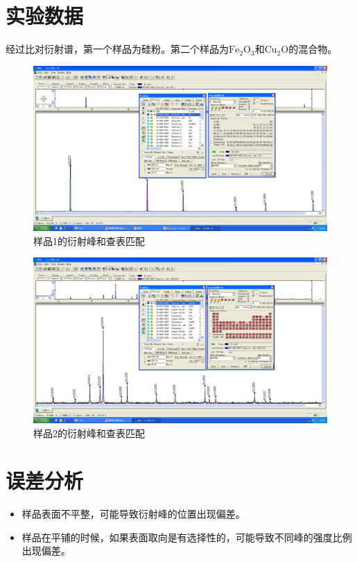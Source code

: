\documentclass[a4paper]{article}
\begin{document}
\section{实验数据}
经过比对衍射谱，第一个样品为硅粉。第二个样品为$\mathrm{Fe_{2}O_{3}}$和$\mathrm{Cu_{2}O}$的混合物。

\begin{figure}[H]
	\centering
	\includegraphics[width=1\linewidth]{data/图片2.png}
	\caption{样品1的衍射峰和查表匹配}
\end{figure}

\begin{figure}[H]
	\centering
	\includegraphics[width=1\linewidth]{data/图片1.png}
	\caption{样品2的衍射峰和查表匹配}
\end{figure}

\section{误差分析}
\begin{itemize}
	\item 样品表面不平整，可能导致衍射峰的位置出现偏差。
	\item 样品在平铺的时候，如果表面取向是有选择性的，可能导致不同峰的强度比例出现偏差。
\end{itemize}
\end{document}
